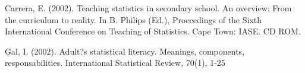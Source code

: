 \documentclass[a4paper]{article}
\begin{document}
%

%


Carrera, E. (2002). Teaching statistics in secondary school. An overview: From the curriculum to reality. In B. Philips (Ed.), Proceedings of the Sixth International Conference on  Teaching of Statistics. Cape Town: IASE. CD ROM.

Gal, I. (2002).  Adult?s statistical literacy. Meanings, components, responsabilities. International Statistical Review, 70(1), 1-25


%
%
%
\end{document}
